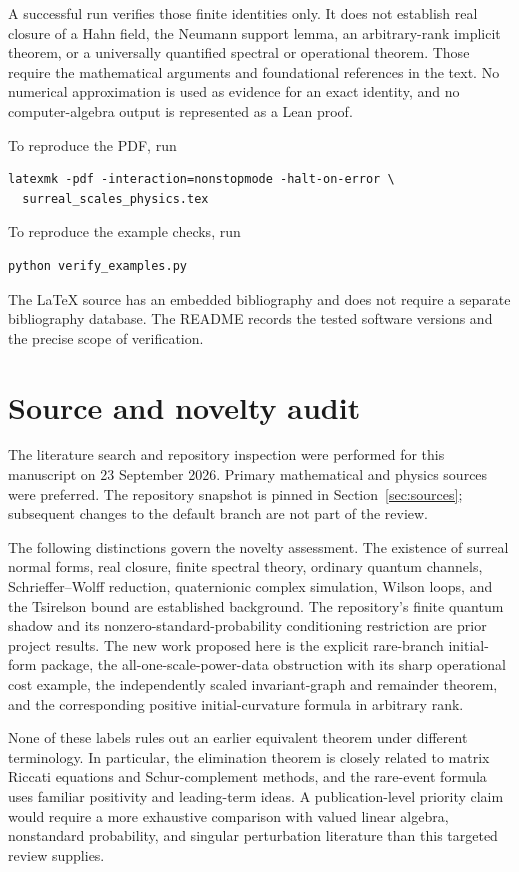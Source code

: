 \documentclass[11pt,oneside]{article}
\numberwithin{equation}{section}
\theoremstyle{plain}
\theoremstyle{definition}
\theoremstyle{remark}
\begin{document}
A successful run verifies those finite identities only. It does not establish real closure of a Hahn field, the Neumann support lemma, an arbitrary-rank implicit theorem, or a universally quantified spectral or operational theorem. Those require the mathematical arguments and foundational references in the text. No numerical approximation is used as evidence for an exact identity, and no computer-algebra output is represented as a Lean proof.

To reproduce the PDF, run
\begin{verbatim}
latexmk -pdf -interaction=nonstopmode -halt-on-error \
  surreal_scales_physics.tex
\end{verbatim}
To reproduce the example checks, run
\begin{verbatim}
python verify_examples.py
\end{verbatim}
The LaTeX source has an embedded bibliography and does not require a separate bibliography database. The README records the tested software versions and the precise scope of verification.

\section{Source and novelty audit}\label{app:audit}
The literature search and repository inspection were performed for this manuscript on 23 September 2026. Primary mathematical and physics sources were preferred. The repository snapshot is pinned in Section~\ref{sec:sources}; subsequent changes to the default branch are not part of the review.

The following distinctions govern the novelty assessment. The existence of surreal normal forms, real closure, finite spectral theory, ordinary quantum channels, Schrieffer--Wolff reduction, quaternionic complex simulation, Wilson loops, and the Tsirelson bound are established background. The repository's finite quantum shadow and its nonzero-standard-probability conditioning restriction are prior project results. The new work proposed here is the explicit rare-branch initial-form package, the all-one-scale-power-data obstruction with its sharp operational cost example, the independently scaled invariant-graph and remainder theorem, and the corresponding positive initial-curvature formula in arbitrary rank.

None of these labels rules out an earlier equivalent theorem under different terminology. In particular, the elimination theorem is closely related to matrix Riccati equations and Schur-complement methods, and the rare-event formula uses familiar positivity and leading-term ideas. A publication-level priority claim would require a more exhaustive comparison with valued linear algebra, nonstandard probability, and singular perturbation literature than this targeted review supplies.
\end{document}
